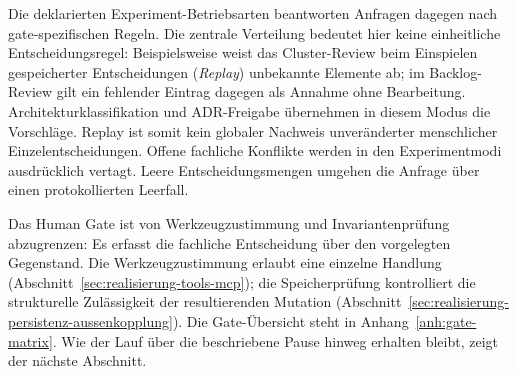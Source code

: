 Die deklarierten Experiment-Betriebsarten beantworten Anfragen dagegen
nach gate-spezifischen Regeln. Die zentrale Verteilung bedeutet hier
keine einheitliche Entscheidungsregel: Beispielsweise weist das
Cluster-Review beim Einspielen gespeicherter Entscheidungen
(\emph{Replay}) unbekannte Elemente ab; im Backlog-Review gilt ein
fehlender Eintrag dagegen als Annahme ohne Bearbeitung.
Architekturklassifikation und ADR-Freigabe übernehmen in diesem Modus die
Vorschläge. Replay ist somit kein globaler Nachweis unveränderter
menschlicher Einzelentscheidungen. Offene fachliche Konflikte werden
in den Experimentmodi ausdrücklich vertagt. Leere Entscheidungsmengen
umgehen die Anfrage über einen protokollierten Leerfall.

Das Human Gate ist von Werkzeugzustimmung und Invariantenprüfung
abzugrenzen: Es erfasst die fachliche Entscheidung über den vorgelegten
Gegenstand. Die Werkzeugzustimmung erlaubt eine einzelne Handlung
(Abschnitt~\ref{sec:realisierung-tools-mcp}); die Speicherprüfung
kontrolliert die strukturelle Zulässigkeit der resultierenden Mutation
(Abschnitt~\ref{sec:realisierung-persistenz-aussenkopplung}). Die
Gate-Übersicht steht in Anhang~\ref{anh:gate-matrix}. Wie der Lauf über
die beschriebene Pause hinweg erhalten bleibt, zeigt der nächste
Abschnitt.
